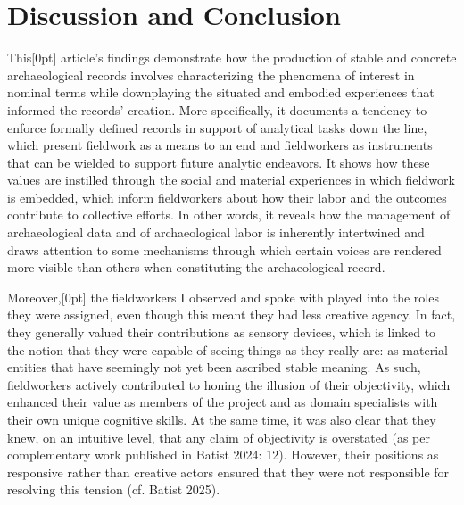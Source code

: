 \documentclass[
]{article}
\newcommand{\paragraphnumber}[1]{\marginnote{\color{lightgray}\tiny{#1}}[0pt]}
\begin{document}
\section{Discussion and Conclusion}\label{discussion-and-conclusion}

This\paragraphnumber{[43]} article's findings demonstrate how the
production of stable and concrete archaeological records involves
characterizing the phenomena of interest in nominal terms while
downplaying the situated and embodied experiences that informed the
records' creation. More specifically, it documents a tendency to enforce
formally defined records in support of analytical tasks down the line,
which present fieldwork as a means to an end and fieldworkers as
instruments that can be wielded to support future analytic endeavors. It
shows how these values are instilled through the social and material
experiences in which fieldwork is embedded, which inform fieldworkers
about how their labor and the outcomes contribute to collective efforts.
In other words, it reveals how the management of archaeological data and
of archaeological labor is inherently intertwined and draws attention to
some mechanisms through which certain voices are rendered more visible
than others when constituting the archaeological record.

Moreover,\paragraphnumber{[44]} the fieldworkers I observed and spoke
with played into the roles they were assigned, even though this meant
they had less creative agency. In fact, they generally valued their
contributions as sensory devices, which is linked to the notion that
they were capable of seeing things as they really are: as material
entities that have seemingly not yet been ascribed stable meaning. As
such, fieldworkers actively contributed to honing the illusion of their
objectivity, which enhanced their value as members of the project and as
domain specialists with their own unique cognitive skills. At the same
time, it was also clear that they knew, on an intuitive level, that any
claim of objectivity is overstated (as per complementary work published
in Batist 2024: 12). However, their positions as responsive rather than
creative actors ensured that they were not responsible for resolving
this tension (cf. Batist 2025).
\end{document}
